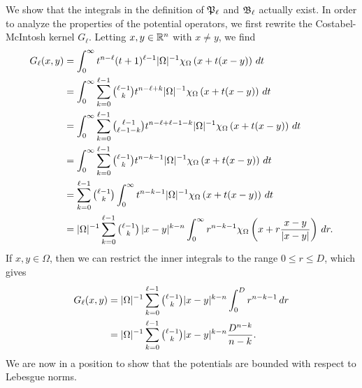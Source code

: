 \documentclass[12pt,a4paper]{article}
\begin{document}
We show that the integrals in the definition of ${\mathfrak P}_{\ell}$ and ${\mathfrak B}_{\ell}$ actually exist. 
In order to analyze the properties of the potential operators,
we first rewrite the Costabel-McIntosh kernel $G_{\ell}$.
Letting $x,y \in {\mathbb R}^n$ with $x \neq y$, we find 
\begin{align*}
    G_{\ell}(x,y) 
    &= 
    \int_{0}^{\infty} t^{n-\ell} (t+1)^{\ell-1} |\Omega|^{-1} \chi_{\Omega} \left( x+t(x-y) \right)\,dt
    \\
    &= 
    \int_{0}^{\infty} \sum_{k=0}^{\ell-1} \tbinom{\ell-1}{k} t^{n-\ell+k} |\Omega|^{-1} \chi_{\Omega} \left( x+t(x-y) \right)\,dt
    \\
    &= 
    \int_{0}^{\infty} \sum_{k=0}^{\ell-1} \tbinom{\ell-1}{\ell-1-k} t^{n-\ell+\ell-1-k} |\Omega|^{-1} \chi_{\Omega} \left( x+t(x-y) \right)\,dt
    \\
    &= 
    \int_{0}^{\infty} \sum_{k=0}^{\ell-1} \tbinom{\ell-1}{k} t^{n-k-1} |\Omega|^{-1} \chi_{\Omega} \left( x+t(x-y) \right)\,dt
    \\
    &= 
    \sum_{k=0}^{\ell-1} \tbinom{\ell-1}{k} \int_{0}^{\infty} t^{n-k-1} |\Omega|^{-1} \chi_{\Omega}\left( x+t(x-y) \right)\,dt 
    \\
    &= 
    |\Omega|^{-1} \sum_{k=0}^{\ell-1} \tbinom{\ell-1}{k} \, |x-y|^{k-n} \int_{0}^{\infty} r^{n-k-1} \chi_{\Omega}\left(x+r\frac{x-y}{|x-y|}\right)\,dr
    .
\end{align*}
If $x, y \in \Omega$, then we can restrict the inner integrals to the range $0 \leq r \leq D$, which gives %
\begin{align*}
    G_{\ell}(x,y) 
    &= 
    |\Omega|^{-1} \sum_{k=0}^{\ell-1}\tbinom{\ell-1}{k} |x-y|^{k-n} \int_{0}^{D} r^{n-k-1} \,dr 
    \\
    &= 
    |\Omega|^{-1} \sum_{k=0}^{\ell-1}\tbinom{\ell-1}{k} |x-y|^{k-n} \frac{ D^{n-k} }{n-k}.
\end{align*}
We are now in a position to show that the potentials are bounded with respect to Lebesgue norms. 
\end{document}
